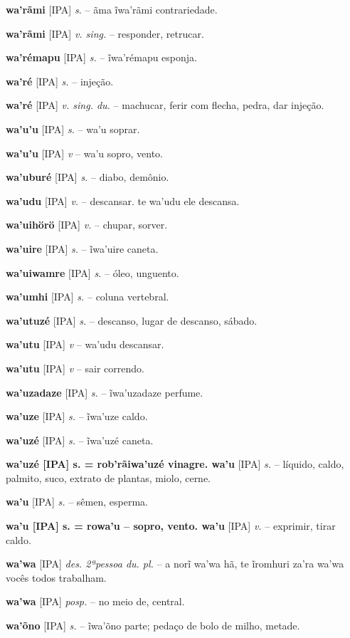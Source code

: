 \textbf{wa'rãmi} [IPA] \textit{s.} -- ãma ĩwa'rãmi contrariedade.

\textbf{wa'rãmi} [IPA] \textit{v. sing.} -- responder, retrucar.

\textbf{wa'rémapu} [IPA] \textit{s.} -- ĩwa'rémapu esponja.

\textbf{wa'ré} [IPA] \textit{s.} -- injeção.

\textbf{wa'ré} [IPA] \textit{v. sing. du.} -- machucar, ferir com flecha, pedra, dar injeção.

\textbf{wa'u'u} [IPA] \textit{s.} -- wa'u soprar.

\textbf{wa'u'u} [IPA] \textit{v} -- wa'u sopro, vento.

\textbf{wa'uburé} [IPA] \textit{s.} -- diabo, demônio.

\textbf{wa'udu} [IPA] \textit{v.} -- descansar. te wa'udu ele descansa.

\textbf{wa'uihörö} [IPA] \textit{v.} -- chupar, sorver.

\textbf{wa'uire} [IPA] \textit{s.} -- ĩwa'uire caneta.

\textbf{wa'uiwamre} [IPA] \textit{s.} -- óleo, unguento.

\textbf{wa'umhi} [IPA] \textit{s.} -- coluna vertebral.

\textbf{wa'utuzé} [IPA] \textit{s.} -- descanso, lugar de descanso, sábado.

\textbf{wa'utu} [IPA] \textit{v} -- wa'udu descansar.

\textbf{wa'utu} [IPA] \textit{v} -- {sair correndo}.

\textbf{wa'uzadaze} [IPA] \textit{s.} -- ĩwa'uzadaze perfume.

\textbf{wa'uze} [IPA] \textit{s.} -- ĩwa'uze caldo.

\textbf{wa'uzé} [IPA] \textit{s.} -- ĩwa'uzé caneta.

\textbf{wa'uzé [IPA] s. = rob'rãiwa'uzé vinagre. wa'u} [IPA] \textit{s.} -- líquido, caldo, palmito, suco, extrato de plantas, miolo, cerne.

\textbf{wa'u} [IPA] \textit{s.} -- sêmen, esperma.

\textbf{wa'u [IPA] s. = rowa'u -- sopro, vento. wa'u} [IPA] \textit{v.} -- exprimir, tirar caldo.

\textbf{wa'wa} [IPA] \textit{des. 2ªpessoa du. pl.} -- a norĩ wa'wa hã, te ĩromhuri za'ra wa'wa vocês todos trabalham.

\textbf{wa'wa} [IPA] \textit{posp.} -- no meio de, central.

\textbf{wa'õno} [IPA] \textit{s.} -- ĩwa'õno parte; pedaço de bolo de milho, metade.

